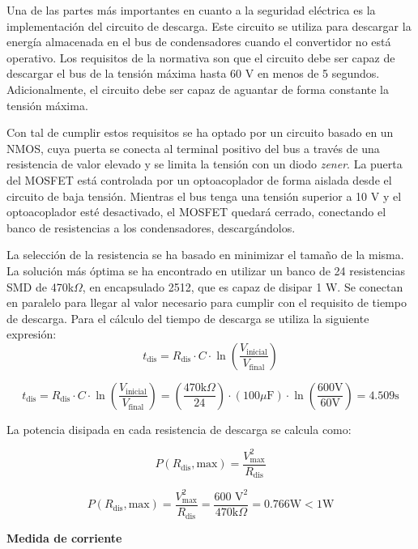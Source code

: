 Una de las partes más importantes en cuanto a la seguridad eléctrica es la implementación del circuito de descarga. Este circuito se utiliza para descargar la energía almacenada en el bus de condensadores cuando el convertidor no está operativo. Los requisitos de la normativa son que el circuito debe ser capaz de descargar el bus de la tensión máxima hasta 60 V en menos de 5 segundos. Adicionalmente, el circuito debe ser capaz de aguantar de forma constante la tensión máxima.

Con tal de cumplir estos requisitos se ha optado por un circuito basado en un NMOS, cuya puerta se conecta al terminal positivo del bus a través de una resistencia de valor elevado y se limita la tensión con un diodo \textit{zener}. La puerta del MOSFET está controlada por un optoacoplador de forma aislada desde el circuito de baja tensión. Mientras el bus tenga una tensión superior a 10 V y el optoacoplador esté desactivado, el MOSFET quedará cerrado, conectando el banco de resistencias a los condensadores, descargándolos.

La selección de la resistencia se ha basado en minimizar el tamaño de la misma. La solución más óptima se ha encontrado en utilizar un banco de 24 resistencias SMD de 470k$\Omega$, en encapsulado 2512, que es capaz de disipar 1 W. Se conectan en paralelo para llegar al valor necesario para cumplir con el requisito de tiempo de descarga. Para el cálculo del tiempo de descarga se utiliza la siguiente expresión:
\begin{equation}
	t_{\text{dis}} = R_{\text{dis}} \cdot C \cdot \ln\left(\frac{V_{\text{inicial}}}{V_{\text{final}}}\right)
\end{equation}

\[
t_{\text{dis}} = R_{\text{dis}} \cdot C \cdot \ln\left(\frac{V_{\text{inicial}}}{V_{\text{final}}}\right) = \left(\frac{470 \text{k}\Omega}{24}\right) \cdot (100 \mu\text{F}) \cdot \ln\left(\frac{600 \text{V}}{60 \text{V}}\right) = 4.509 \text{s}
\]

La potencia disipada en cada resistencia de descarga se calcula como:

\begin{equation}
	P(R_{\text{dis}}, \text{max}) = \frac{V_{\text{max}}^2}{R_{\text{dis}}} 
\end{equation}

\[
P(R_{\text{dis}}, \text{max}) = \frac{V_{\text{max}}^2}{R_{\text{dis}}} = \frac{600\text{ V}^2}{470 \text{k}\Omega} = 0.766 \text{W} < 1 \text{W}
\]

\textbf{Medida de corriente}

